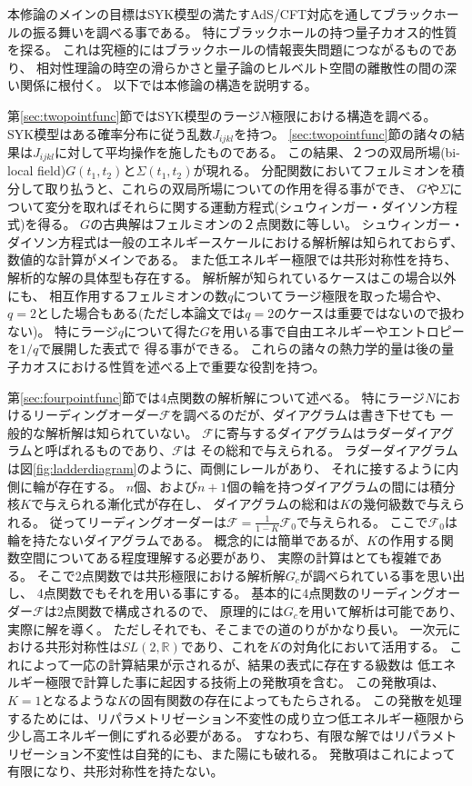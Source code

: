 本修論のメインの目標はSYK模型の満たすAdS/CFT対応を通してブラックホールの振る舞いを調べる事である。
特にブラックホールの持つ量子カオス的性質を探る。
これは究極的にはブラックホールの情報喪失問題につながるものであり、
相対性理論の時空の滑らかさと量子論のヒルベルト空間の離散性の間の深い関係に根付く\cite{stanford_chaos}。
以下では本修論の構造を説明する。

第\ref{sec:twopointfunc}節ではSYK模型のラージ$N$極限における構造を調べる。
SYK模型はある確率分布に従う乱数$J_{ijkl}$を持つ。
\ref{sec:twopointfunc}節の諸々の結果は$J_{ijkl}$に対して平均操作を施したものである。
この結果、２つの双局所場(bi-local field)$G(t_1, t_2)$と$\Sigma(t_1, t_2)$が現れる。
分配関数においてフェルミオンを積分して取り払うと、これらの双局所場についての作用を得る事ができ、
$G$や$\Sigma$について変分を取ればそれらに関する運動方程式(シュウィンガー・ダイソン方程式)を得る。
$G$の古典解はフェルミオンの２点関数に等しい。
シュウィンガー・ダイソン方程式は一般のエネルギースケールにおける解析解は知られておらず、
数値的な計算がメインである。
また低エネルギー極限では共形対称性を持ち、解析的な解の具体型も存在する。
解析解が知られているケースはこの場合以外にも、
相互作用するフェルミオンの数$q$についてラージ極限を取った場合や、
$q=2$とした場合もある(ただし本論文では$q=2$のケースは重要ではないので扱わない)。
特にラージ$q$について得た$G$を用いる事で自由エネルギーやエントロピーを$1/q$で展開した表式で
得る事ができる。
これらの諸々の熱力学的量は後の量子カオスにおける性質を述べる上で重要な役割を持つ。

第\ref{sec:fourpointfunc}節では4点関数の解析解について述べる。
特にラージ$N$におけるリーディングオーダー$\mathcal{F}$を調べるのだが、ダイアグラムは書き下せても
一般的な解析解は知られていない。
$\mathcal{F}$に寄与するダイアグラムはラダーダイアグラムと呼ばれるものであり、$\mathcal{F}$は
その総和で与えられる。
ラダーダイアグラムは図\ref{fig:ladderdiagram}のように、両側にレールがあり、
それに接するように内側に輪が存在する。
$n$個、および$n+1$個の輪を持つダイアグラムの間には積分核$K$で与えられる漸化式が存在し、
ダイアグラムの総和は$K$の幾何級数で与えられる。
従ってリーディングオーダーは$\mathcal{F} = \frac{1}{1-K}\mathcal{F}_0$で与えられる。
ここで$\mathcal{F}_0$は輪を持たないダイアグラムである。
概念的には簡単であるが、$K$の作用する関数空間についてある程度理解する必要があり、
実際の計算はとても複雑である。
そこで2点関数では共形極限における解析解$G_c$が調べられている事を思い出し、
4点関数でもそれを用いる事にする。
基本的に4点関数のリーディングオーダー$\mathcal{F}$は2点関数で構成されるので、
原理的には$G_c$を用いて解析は可能であり、実際に解を導く。
ただしそれでも、そこまでの道のりがかなり長い。
一次元における共形対称性は$SL(2, \mathbb{R})$であり、これを$K$の対角化において活用する。
これによって一応の計算結果が示されるが、結果の表式に存在する級数は
低エネルギー極限で計算した事に起因する技術上の発散項を含む。
この発散項は、$K = 1$となるような$K$の固有関数の存在によってもたらされる。
この発散を処理するためには、リパラメトリゼーション不変性の成り立つ低エネルギー極限から
少し高エネルギー側にずれる必要がある。
すなわち、有限な解ではリパラメトリゼーション不変性は自発的にも、また陽にも破れる。
発散項はこれによって有限になり、共形対称性を持たない。

